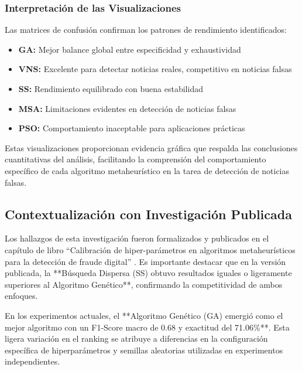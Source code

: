 \newpage

\subsubsection{Interpretación de las Visualizaciones}

Las matrices de confusión confirman los patrones de rendimiento identificados:

\begin{itemize}
    \item \textbf{GA:} Mejor balance global entre especificidad y exhaustividad
    \item \textbf{VNS:} Excelente para detectar noticias reales, competitivo en noticias falsas
    \item \textbf{SS:} Rendimiento equilibrado con buena estabilidad
    \item \textbf{MSA:} Limitaciones evidentes en detección de noticias falsas
    \item \textbf{PSO:} Comportamiento inaceptable para aplicaciones prácticas
\end{itemize}

Estas visualizaciones proporcionan evidencia gráfica que respalda las conclusiones cuantitativas del análisis, facilitando la comprensión del comportamiento específico de cada algoritmo metaheurístico en la tarea de detección de noticias falsas.

\subsection{Contextualización con Investigación Publicada}
\label{subsec:contextualizacion_investigacion}

Los hallazgos de esta investigación fueron formalizados y publicados en el capítulo de libro ``Calibración de hiper-parámetros en algoritmos metaheurísticos para la detección de fraude digital'' \cite{hurtado2024calibracion}. Es importante destacar que en la versión publicada, la **Búsqueda Dispersa (SS) obtuvo resultados iguales o ligeramente superiores al Algoritmo Genético**, confirmando la competitividad de ambos enfoques.

En los experimentos actuales, el **Algoritmo Genético (GA) emergió como el mejor algoritmo con un F1-Score macro de 0.68 y exactitud del 71.06\%**. Esta ligera variación en el ranking se atribuye a diferencias en la configuración específica de hiperparámetros y semillas aleatorias utilizadas en experimentos independientes.

